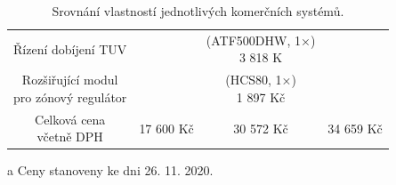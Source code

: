 \begin{center}
\begin{table}[H]
\begin{threeparttable}
\begin{tabular}{|c||c|c|c|}
Řízení dobíjení TUV & & \makecell{(ATF500DHW, 1×) \\ 3 818 K}  & \\
\makecell{Rozšiřující modul \\ pro zónový regulátor}  & & \makecell{(HCS80, 1×) \\ 1 897 Kč} & \\
\thead{Celková cena \\ včetně DPH \tnote{a}} & 17 600 Kč & 30 572 Kč & 34 659 Kč\\ 
\hline
\end{tabular}

	\begin{tablenotes}
    	\item[a] Ceny stanoveny ke dni 26. 11. 2020.
	\end{tablenotes}
\end{threeparttable}

 \label{tab:srovnani-vlastnosti-jednotlivych-komercnich-systemu}
 \caption{Srovnání vlastností jednotlivých komerčních systémů.}
\end{table}
\end{center}








